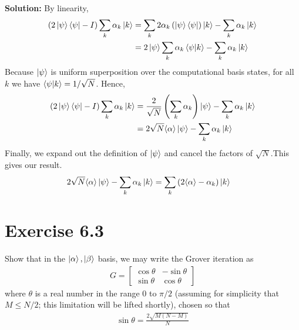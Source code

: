 \documentclass{book}
\begin{document}
    \textbf{Solution:} By linearity,
    \begin{align*}
        (2\ket{\psi}\bra{\psi}-I)\sum_k \alpha_k\ket{k} &= \sum_k 2 \alpha_k\left(\ket{\psi}\bra{\psi}\right)\ket{k} - \sum_k \alpha_k\ket{k} \\
        &= 2\ket{\psi}\sum_k\alpha_k\braket{\psi}{k}-\sum_k\alpha_k\ket{k}
    \end{align*}
    Because $\ket{\psi}$ is uniform superposition over the computational basis states, for all $k$ we have $\braket{\psi}{k}=1/\sqrt{N}$. Hence,
    \begin{align}
    (2\ket{\psi}\bra{\psi}-I)\sum_k \alpha_k\ket{k} &= \frac{2}{\sqrt{N}}\left(\sum_k\alpha_k\right)\ket{\psi} - \sum_k \alpha_k\ket{k} \\
    &= 2\sqrt{N} \langle\alpha\rangle\ket{\psi} - \sum_k\alpha_k\ket{k}
    \end{align}
    Finally, we expand out the definition of $\ket{\psi}$ and cancel the factors of $\sqrt{N}$.This gives our result. 
    \begin{align}
        2\sqrt{N} \langle\alpha\rangle\ket{\psi} - \sum_k\alpha_k\ket{k} &= \sum_k\left(2\langle\alpha\rangle-\alpha_k\right)\ket{k}
    \end{align}

\section*{Exercise 6.3}
    Show that in the $\ket{\alpha}, \ket{\beta}$ basis, we may write the Grover iteration as
    \begin{align}
        G = 
        \begin{bmatrix} \label{eq:matrix_G}
            \cos\theta & -\sin\theta \\
            \sin\theta & \cos\theta
        \end{bmatrix}
    \end{align}
    where $\theta$ is a real number in the range 0 to $\pi/2$ (assuming for simplicity that $M\leq N/2$; this limitation will be lifted shortly), chosen so that
    \begin{align} \label{eq:theta_value}
        \sin\theta =\frac{2\sqrt{M(N-M)}}{N}
    \end{align}
    
\end{document}
